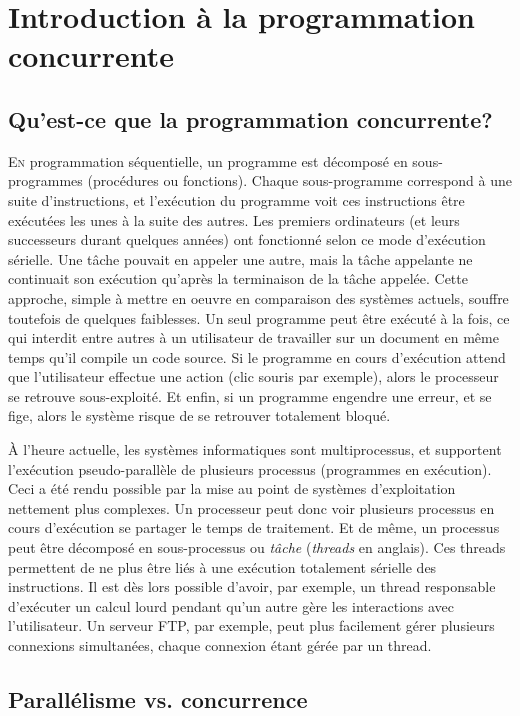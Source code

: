 \chapter{Introduction à la programmation concurrente}\label{sec:into}
\startchapter

\section{Qu'est-ce que la programmation concurrente?}


\lettrine[lines=3]{E}{n} programmation séquentielle, un programme est décomposé en sous-programmes (procédures ou fonctions). Chaque sous-programme correspond à une suite d'instructions, et l'exécution du programme voit ces instructions être exécutées les unes à la suite des autres. Les premiers ordinateurs (et leurs successeurs durant quelques années) ont fonctionné selon ce mode d'exécution sérielle. Une tâche pouvait en appeler une autre, mais la tâche appelante ne continuait son exécution qu'après la terminaison de la tâche appelée. Cette approche, simple à mettre en oeuvre en comparaison des systèmes actuels, souffre toutefois de quelques faiblesses. Un seul programme peut être exécuté à la fois, ce qui interdit entre autres à un utilisateur de travailler sur un document en même temps qu'il compile un code source. Si le programme en cours d'exécution attend que l'utilisateur effectue une action (clic souris par exemple), alors le processeur se retrouve sous-exploité. Et enfin, si un programme engendre une erreur, et se fige, alors le système risque de se retrouver totalement bloqué.

À l'heure actuelle, les systèmes informatiques sont multiprocessus, et supportent l'exécution pseudo-parallèle de plusieurs processus (programmes en exécution). Ceci a été rendu possible par la mise au point de systèmes d'exploitation nettement plus complexes. Un processeur peut donc voir plusieurs processus en cours d'exécution se partager le temps de traitement. Et de même, un processus peut être décomposé en sous-processus ou \emph{tâche} (\emph{threads} en anglais). Ces threads permettent de ne plus être liés à une exécution totalement sérielle des instructions. Il est dès lors possible d'avoir, par exemple, un thread responsable d'exécuter un calcul lourd pendant qu'un autre gère les interactions avec l'utilisateur. Un serveur FTP, par exemple, peut plus facilement gérer plusieurs connexions simultanées, chaque connexion étant gérée par un thread.


\section{Parallélisme vs. concurrence}

